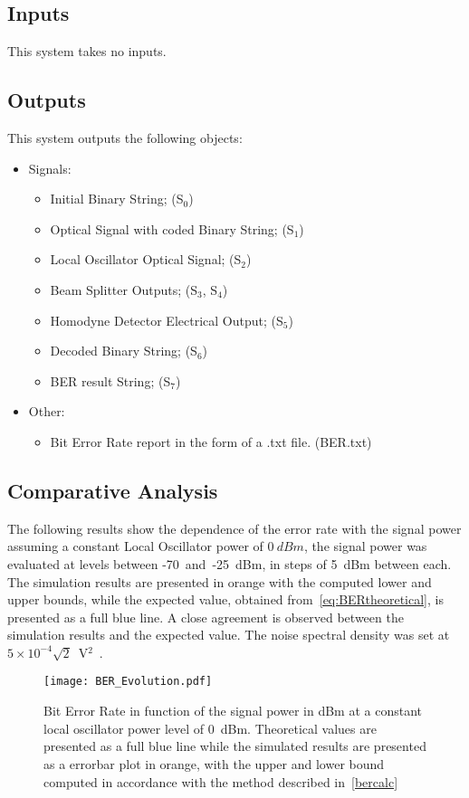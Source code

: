 \subsection*{Inputs}

This system takes no inputs.

\subsection*{Outputs}

This system outputs the following objects:
\begin{itemize}
\item Signals:
\begin{itemize}
\item Initial Binary String; (S$_0$)
\item Optical Signal with coded Binary String; (S$_{1}$)
\item Local Oscillator Optical Signal; (S$_{2}$)
\item Beam Splitter Outputs; (S$_{3}$, S$_{4}$)
\item Homodyne Detector Electrical Output; (S$_{5}$)
\item Decoded Binary String; (S$_{6}$)
\item BER result String; (S$_{7}$)
\end{itemize}
\item Other:
\begin{itemize}
\item Bit Error Rate report in the form of a .txt file. (BER.txt)
\end{itemize}
\end{itemize}

\subsection{Comparative Analysis}

The following results show the dependence of the error rate with the signal power assuming a constant Local Oscillator power of $0~dBm$, the signal power was evaluated at levels between -70~and~-25~dBm, in steps of 5~dBm between each. The simulation results are presented in orange with the computed lower and upper bounds, while the expected value, obtained from~\eqref{eq:BERtheoretical}, is presented as a full blue line. A close agreement is observed between the simulation results and the expected value. The noise spectral density was set at $5\times10^{-4}\sqrt{2}$~V$^2$~\cite{thorlabs}. 
\begin{figure}[H]
\centering
\texttt{[image: BER\_Evolution.pdf]}
\caption{Bit Error Rate in function of the signal power in dBm at a constant local oscillator power level of 0~dBm. Theoretical values are presented as a full blue line while the simulated results are presented as a errorbar plot in orange, with the upper and lower bound computed in accordance with the method described in~\ref{bercalc}}
\label{fig:berevolution}
\end{figure}


 
